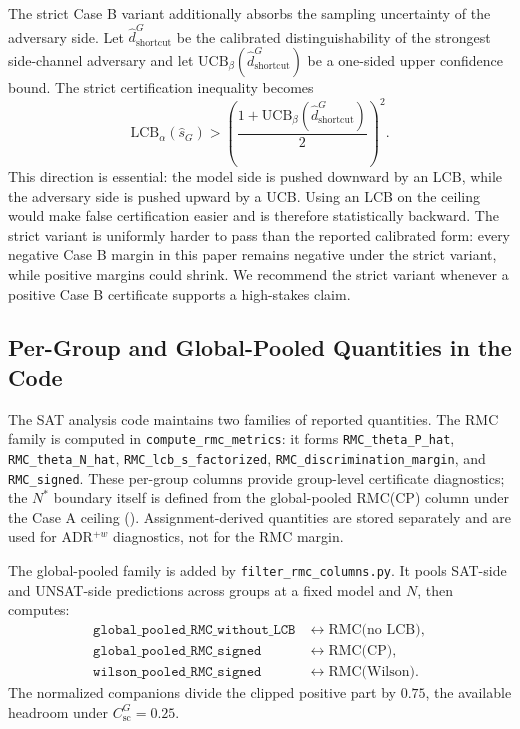 \documentclass[conference]{IEEEtran}
\theoremstyle{remark}
\newcommand{\LCB}{\mathrm{LCB}}
\newcommand{\UCB}{\mathrm{UCB}}
\newcommand{\shat}{\hat{s}_G}
\newcommand{\hatshortcutDisc}{\hat d_{\mathrm{shortcut}}^{G}}
\newcommand{\shortcutCeiling}{C_{\mathrm{sc}}^{G}}
\begin{document}
The strict Case B variant additionally absorbs the sampling uncertainty of the
adversary side.
Let $\hatshortcutDisc$ be the calibrated distinguishability of the strongest
side-channel adversary and let $\UCB_\beta(\hatshortcutDisc)$ be a one-sided upper
confidence bound.
The strict certification inequality becomes
\begin{equation}\label{eq:formula-66}
\LCB_\alpha(\shat)
>
\left(
\frac{1+\UCB_\beta(\hatshortcutDisc)}{2}
\right)^2.
\end{equation}
This direction is essential: the model side is pushed downward by an LCB, while
the adversary side is pushed upward by a UCB.
Using an LCB on the ceiling would make false certification easier and is
therefore statistically backward.
The strict variant is uniformly harder to pass than the reported calibrated
form: every negative Case B margin in this paper remains negative under the
strict variant, while positive margins could shrink.
We recommend the strict variant whenever a positive Case B certificate supports
a high-stakes claim.

\subsection{Per-Group and Global-Pooled Quantities in the Code}

The SAT analysis code maintains two families of reported quantities.
The RMC family is computed in
\texttt{compute\_rmc\_metrics}: it forms
\texttt{RMC\_theta\_P\_hat}, \texttt{RMC\_theta\_N\_hat},
\texttt{RMC\_lcb\_s\_factorized}, \texttt{RMC\_discrimination\_margin}, and
\texttt{RMC\_signed}.  These per-group columns provide group-level certificate diagnostics; the $N^*$ boundary itself is defined from the global-pooled RMC(CP) column under the Case A ceiling ().  Assignment-derived quantities are stored separately and are used for ADR$^{+w}$ diagnostics, not for the RMC margin.

The global-pooled family is added by \texttt{filter\_rmc\_columns.py}.
It pools SAT-side and UNSAT-side predictions across groups at a fixed model and
$N$, then computes:
\begin{equation}\label{eq:formula-67}
\begin{array}{ll}
\texttt{global\_pooled\_RMC\_without\_LCB} &\leftrightarrow \text{RMC(no LCB)},\\
\texttt{global\_pooled\_RMC\_signed} &\leftrightarrow \text{RMC(CP)},\\
\texttt{wilson\_pooled\_RMC\_signed} &\leftrightarrow \text{RMC(Wilson)}.
\end{array}
\end{equation}
The normalized companions divide the clipped positive part by $0.75$, the
available headroom under $\shortcutCeiling=0.25$.
\end{document}
